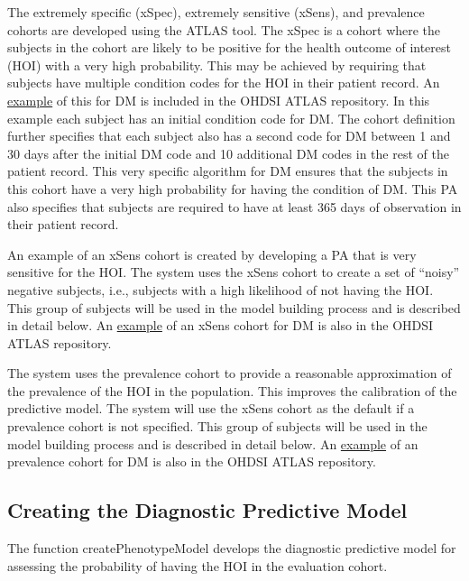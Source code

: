 \documentclass[
]{article}
\begin{document}
The extremely specific (xSpec), extremely sensitive (xSens), and
prevalence cohorts are developed using the ATLAS tool. The xSpec is a
cohort where the subjects in the cohort are likely to be positive for
the health outcome of interest (HOI) with a very high probability. This
may be achieved by requiring that subjects have multiple condition codes
for the HOI in their patient record. An
\href{http://www.ohdsi.org/web/atlas/\#/cohortdefinition/1769699}{example}
of this for DM is included in the OHDSI ATLAS repository. In this
example each subject has an initial condition code for DM. The cohort
definition further specifies that each subject also has a second code
for DM between 1 and 30 days after the initial DM code and 10 additional
DM codes in the rest of the patient record. This very specific algorithm
for DM ensures that the subjects in this cohort have a very high
probability for having the condition of DM. This PA also specifies that
subjects are required to have at least 365 days of observation in their
patient record.

An example of an xSens cohort is created by developing a PA that is very
sensitive for the HOI. The system uses the xSens cohort to create a set
of ``noisy'' negative subjects, i.e., subjects with a high likelihood of
not having the HOI. This group of subjects will be used in the model
building process and is described in detail below. An
\href{http://www.ohdsi.org/web/atlas/\#/cohortdefinition/1770120}{example}
of an xSens cohort for DM is also in the OHDSI ATLAS repository.

The system uses the prevalence cohort to provide a reasonable
approximation of the prevalence of the HOI in the population. This
improves the calibration of the predictive model. The system will use
the xSens cohort as the default if a prevalence cohort is not specified.
This group of subjects will be used in the model building process and is
described in detail below. An
\href{http://www.ohdsi.org/web/atlas/\#/cohortdefinition/1770119}{example}
of an prevalence cohort for DM is also in the OHDSI ATLAS repository.

\hypertarget{creating-the-diagnostic-predictive-model}{%
\subsection{Creating the Diagnostic Predictive
Model}\label{creating-the-diagnostic-predictive-model}}

The function createPhenotypeModel develops the diagnostic predictive
model for assessing the probability of having the HOI in the evaluation
cohort.
\end{document}
